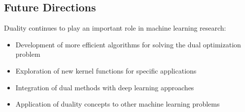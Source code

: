 \documentclass{article}
\begin{document}
\subsection{Future Directions}
Duality continues to play an important role in machine learning research:

\begin{itemize}
    \item Development of more efficient algorithms for solving the dual optimization problem
    \item Exploration of new kernel functions for specific applications
    \item Integration of dual methods with deep learning approaches
    \item Application of duality concepts to other machine learning problems
\end{itemize}
\end{document}

